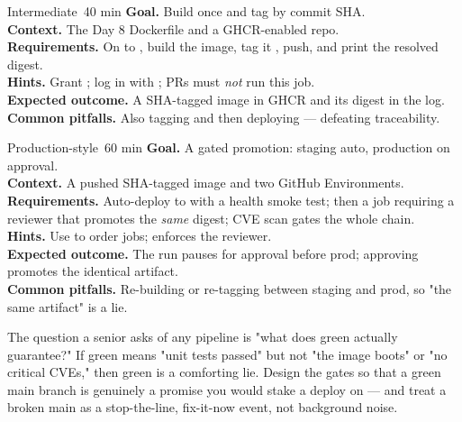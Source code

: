 \begin{minilab}{Intermediate}{~40 min}
\textbf{Goal.} Build once and tag by commit SHA.\\
\textbf{Context.} The Day 8 Dockerfile and a GHCR-enabled repo.\\
\textbf{Requirements.} On  to , build the image, tag it , push, and print the resolved  digest.\\
\textbf{Hints.} Grant ; log in with ; PRs must \emph{not} run this job.\\
\textbf{Expected outcome.} A SHA-tagged image in GHCR and its digest in the log.\\
\textbf{Common pitfalls.} Also tagging  and then deploying  --- defeating traceability.
\end{minilab}

\begin{minilab}{Production-style}{~60 min}
\textbf{Goal.} A gated promotion: staging auto, production on approval.\\
\textbf{Context.} A pushed SHA-tagged image and two GitHub Environments.\\
\textbf{Requirements.} Auto-deploy to  with a health smoke test; then a  job requiring a reviewer that promotes the \emph{same} digest; CVE scan gates the whole chain.\\
\textbf{Hints.} Use  to order jobs;  enforces the reviewer.\\
\textbf{Expected outcome.} The run pauses for approval before prod; approving promotes the identical artifact.\\
\textbf{Common pitfalls.} Re-building or re-tagging between staging and prod, so "the same artifact" is a lie.
\end{minilab}


\begin{seniornote}
The question a senior asks of any pipeline is "what does green actually guarantee?" If green means "unit tests passed" but not "the image boots" or "no critical CVEs," then green is a comforting lie. Design the gates so that a green main branch is genuinely a promise you would stake a deploy on --- and treat a broken main as a stop-the-line, fix-it-now event, not background noise.
\end{seniornote}

